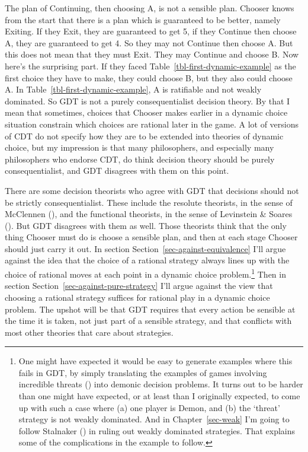 \documentclass[
  12pt,
  letterpaper,
  DIV=11,
  numbers=noendperiod]{scrreprt}
\begin{document}
The plan of Continuing, then choosing A, is not a sensible plan. Chooser
knows from the start that there is a plan which is guaranteed to be
better, namely Exiting. If they Exit, they are guaranteed to get 5, if
they Continue then choose A, they are guaranteed to get 4. So they may
not Continue then choose A. But this does not mean that they must Exit.
They may Continue and choose B. Now here's the surprising part. If they
faced Table~\ref{tbl-first-dynamic-example} as the first choice they
have to make, they could choose B, but they also could choose A. In
Table~\ref{tbl-first-dynamic-example}, A is ratifiable and not weakly
dominated. So GDT is not a purely consequentialist decision theory. By
that I mean that sometimes, choices that Chooser makes earlier in a
dynamic choice situation constrain which choices are rational later in
the game. A lot of versions of CDT do not specify how they are to be
extended into theories of dynamic choice, but my impression is that many
philosophers, and especially many philosophers who endorse CDT, do think
decision theory should be purely consequentialist, and GDT disagrees
with them on this point.

There are some decision theorists who agree with GDT that decisions
should not be strictly consequentialist. These include the resolute
theorists, in the sense of McClennen
(), and the functional theorists, in
the sense of Levinstein \& Soares
(). But GDT disagrees with them
as well. Those theorists think that the only thing Chooser must do is
choose a sensible plan, and then at each stage Chooser should just carry
it out. In section Section~\ref{sec-against-equivalence} I'll argue
against the idea that the choice of a rational strategy always lines up
with the choice of rational moves at each point in a dynamic choice
problem.\footnote{One might have expected it would be easy to generate
  examples where this fails in GDT, by simply translating the examples
  of games involving incredible threats
  () into demonic decision
  problems. It turns out to be harder than one might have expected, or
  at least than I originally expected, to come up with such a case where
  (a) one player is Demon, and (b) the `threat' strategy is not weakly
  dominated. And in Chapter~\ref{sec-weak} I'm going to follow Stalnaker
  () in ruling out weakly dominated
  strategies. That explains some of the complications in the example to
  follow.} Then in section Section~\ref{sec-against-pure-strategy} I'll
argue against the view that choosing a rational strategy suffices for
rational play in a dynamic choice problem. The upshot will be that GDT
requires that every action be sensible at the time it is taken, not just
part of a sensible strategy, and that conflicts with most other theories
that care about strategies.
\end{document}
